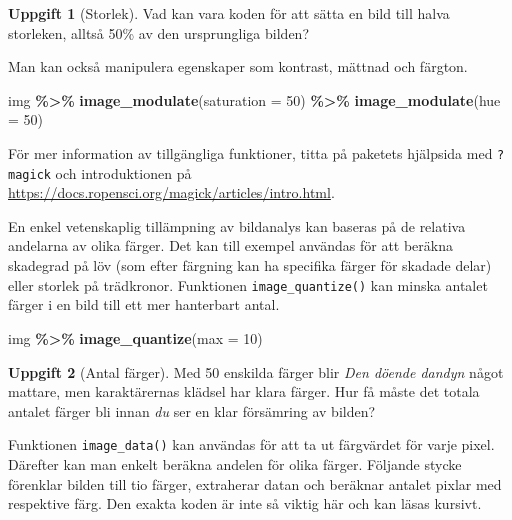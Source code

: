 \documentclass[
]{book}
\newenvironment{Shaded}{\begin{snugshade}}{\end{snugshade}}
\newcommand{\AttributeTok}[1]{\textcolor[rgb]{0.13,0.29,0.53}{#1}}
\newcommand{\DecValTok}[1]{\textcolor[rgb]{0.00,0.00,0.81}{#1}}
\newcommand{\FunctionTok}[1]{\textcolor[rgb]{0.13,0.29,0.53}{\textbf{#1}}}
\newcommand{\NormalTok}[1]{#1}
\newcommand{\SpecialCharTok}[1]{\textcolor[rgb]{0.81,0.36,0.00}{\textbf{#1}}}
\theoremstyle{definition}
\theoremstyle{definition}
\theoremstyle{definition}
\newtheorem{exercise}{Uppgift}[chapter]
\theoremstyle{definition}
\theoremstyle{remark}
\begin{document}
\begin{exercise}[Storlek]
Vad kan vara koden för att sätta en bild till halva storleken, alltså 50\% av den ursprungliga bilden?
\end{exercise}

Man kan också manipulera egenskaper som kontrast, mättnad och färgton.

\begin{Shaded}
\begin{Highlighting}[]
\NormalTok{img }\SpecialCharTok{\%\textgreater{}\%} 
  \FunctionTok{image\_modulate}\NormalTok{(}\AttributeTok{saturation =} \DecValTok{50}\NormalTok{) }\SpecialCharTok{\%\textgreater{}\%} 
  \FunctionTok{image\_modulate}\NormalTok{(}\AttributeTok{hue =} \DecValTok{50}\NormalTok{)}
\end{Highlighting}
\end{Shaded}

För mer information av tillgängliga funktioner, titta på paketets hjälpsida med \texttt{?magick} och introduktionen på \url{https://docs.ropensci.org/magick/articles/intro.html}.

En enkel vetenskaplig tillämpning av bildanalys kan baseras på de relativa andelarna av olika färger. Det kan till exempel användas för att beräkna skadegrad på löv (som efter färgning kan ha specifika färger för skadade delar) eller storlek på trädkronor. Funktionen \texttt{image\_quantize()} kan minska antalet färger i en bild till ett mer hanterbart antal.

\begin{Shaded}
\begin{Highlighting}[]
\NormalTok{img }\SpecialCharTok{\%\textgreater{}\%} \FunctionTok{image\_quantize}\NormalTok{(}\AttributeTok{max =} \DecValTok{10}\NormalTok{)}
\end{Highlighting}
\end{Shaded}

\begin{exercise}[Antal färger]
Med 50 enskilda färger blir \emph{Den döende dandyn} något mattare, men karaktärernas klädsel har klara färger. Hur få måste det totala antalet färger bli innan \emph{du} ser en klar försämring av bilden?
\end{exercise}

Funktionen \texttt{image\_data()} kan användas för att ta ut färgvärdet för varje pixel. Därefter kan man enkelt beräkna andelen för olika färger. Följande stycke förenklar bilden till tio färger, extraherar datan och beräknar antalet pixlar med respektive färg. Den exakta koden är inte så viktig här och kan läsas kursivt.
\end{document}
